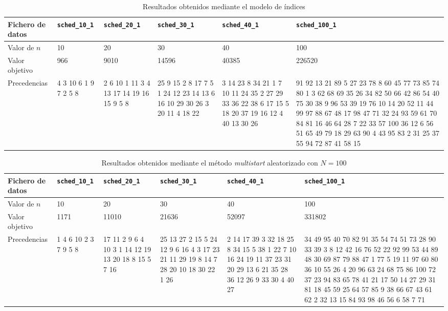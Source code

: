 \documentclass[a4paper,11pt]{article}
\begin{document}
\begin{table}[!htbp]
\label{tb:results_indices}
\centering\scriptsize
\begin{tabularx}{\textwidth}{|X|X|X|X|X|X|}
\hline
Fichero de datos	& \texttt{sched\_10\_1}	& \texttt{sched\_20\_1}	& \texttt{sched\_30\_1}	& \texttt{sched\_40\_1}	& \texttt{sched\_100\_1}	\\ \hline
Valor de $n$        & 10    & 20    & 30    & 40    & 100   \\ \hline
Valor objetivo      & 966   & 9010  & 14596 & 40385 & 226520    \\ \hline
Precedencias        & 4 3 10 6 1 9 7 2 5 8  & 2 6 10 1 11 3 4 13 17 14 19 16 15 9 5 8   & 25 9 15 2 8 17 7 5 1 24 12 23 14 13 6 16 10 29 30 26 3 20 11 4 18 22  & 3 14 23 8 34 21 1 7 10 11 24 35 2 27 29 33 36 22 38 6 17 15 5 18 20 37 19 16 12 4 40 13 30 26 & 91 92 13 21 89 5 27 23 78 8 60 45 77 73 85 74 80 1 3 62 68 69 35 26 34 82 50 66 42 86 54 40 75 30 38 9 96 53 39 19 76 10 14 20 52 11 44 99 97 88 67 48 17 98 47 71 32 24 93 59 61 70 84 81 16 46 64 28 7 22 33 57 100 36 12 6 56 51 65 49 79 18 29 63 90 4 43 95 83 2 31 25 37 55 94 72 87 41 58 15	\\ \hline
\end{tabularx}
\caption{Resultados obtenidos mediante el modelo de índices}
\end{table}

\begin{table}[!htbp]
\label{tb:results_multistart_100}
\centering\scriptsize
\begin{tabularx}{\textwidth}{|X|X|X|X|X|X|}
\hline
Fichero de datos	& \texttt{sched\_10\_1}	& \texttt{sched\_20\_1}	& \texttt{sched\_30\_1}	& \texttt{sched\_40\_1}	& \texttt{sched\_100\_1}	\\ \hline
Valor de $n$        & 10    & 20    & 30    & 40    & 100   \\ \hline
Valor objetivo      & 1171  & 11010 & 21636 & 52097 & 331802    \\ \hline
Precedencias        & 1 4 6 10 2 3 7 9 5 8 & 17 11 2 9 6 4 10 3 1 14 12 19 13 20 18 8 15 5 7 16 & 25 13 27 2 15 5 24 12 9 6 16 4 3 17 23 21 11 29 19 8 14 7 28 20 10 18 30 22 1 26  & 2 14 17 39 3 32 18 25 8 34 15 5 38 1 22 7 10 16 24 19 11 37 23 31 20 29 13 6 21 35 28 36 12 26 9 33 30 4 40 27    & 34 49 95 40 70 82 91 35 54 74 51 73 28 90 33 39 3 8 12 42 16 76 52 22 92 99 53 44 89 48 30 69 87 79 88 47 1 77 5 19 11 97 60 80 36 10 55 26 4 20 96 63 24 68 75 86 100 72 37 23 94 83 65 78 41 21 17 50 14 27 29 31 81 18 45 59 25 64 57 85 9 38 66 67 43 61 62 2 32 13 15 84 93 98 46 56 6 58 7 71   \\ \hline
\end{tabularx}
\caption{Resultados obtenidos mediante el método \textit{multistart} aleatorizado con ${N=100}$}
\end{table}
\end{document}
